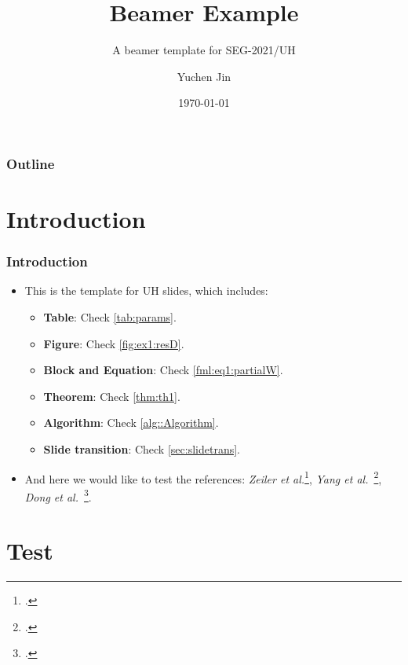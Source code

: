 \documentclass[aspectratio=169,hyperref={implicit=true}]{beamer}
\title[Demo]{Beamer Example}
\author{Yuchen Jin}
\subtitle{A beamer template for SEG-2021/UH}
\date{\today} %
\institute[Department of ECE]{University of Houston\\Department of ECE}
\begin{document}
\titleframe

\begin{frame}

\frametitle{Outline}
\tableofcontents[currentsection]

\end{frame}

\section{Introduction}

\begin{frame}
  
\frametitle{Introduction}

\begin{itemize}
  \item This is the template for UH slides, which includes:
  \begin{itemize}
    \item \textbf{Table}: Check \cref{tab:params}.
    \item \textbf{Figure}: Check \cref{fig:ex1:resD}.
    \item \textbf{Block and Equation}: Check \eqref{fml:eq1:partialW}.
    \item \textbf{Theorem}: Check \cref{thm:th1}.
    \item \textbf{Algorithm}: Check \cref{alg::Algorithm}.
    \item \textbf{Slide transition}: Check \cref{sec:slidetrans}.
  \end{itemize}
  \item And here we would like to test the references: \textit{Zeiler et al.}\footcite{Zeiler5539957}, \textit{Yang et al.}~\footcite{Yang6175956}, \textit{Dong et al.}~\footcite{Dong7115171}.
\end{itemize}

\end{frame}

\section{Test}
\end{document}
